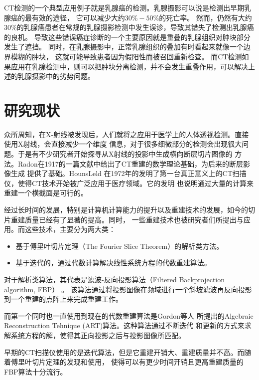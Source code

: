 CT检测的一个典型应用例子就是乳腺癌的检测。乳腺摄影可以说是检测出早期乳腺癌的最有效的途径，
它可以减少大约$30\%-50\%$的死亡率。
然而，仍然有大约$30\%$的乳腺癌患者在常规的乳腺摄影检测中发生误诊，导致其错失了检测出乳腺癌的良机。
导致这些错误癌症诊断的一个主要原因就是重叠的乳腺组织对肿块部分发生了遮挡。
同时，在乳腺摄影中，正常乳腺组织的叠加有时看起来就像一个边界模糊的肿块，
这就可能导致患者因为假阳性而被召回重新检查。
而CT检测如果应用在乳腺检测中，则可以把肿块分离检测，并不会发生重叠作用，可以解决上述的乳腺摄影中的劣势问题。

\section{研究现状}\label{sec:current}
众所周知，在X-射线被发现后，人们就将之应用于医学上的人体透视检测。直接使用X射线，会直接减少一个维度
信息，对于很多细微部分的检测会出现很大问题。于是有不少研究者开始探寻从X射线的投影中生成横向断层切片图像的
方法。Radon在1917的一篇文献中给出了CT重建的数学理论基础\cite{radon1986}，为后来的断层影像生成
提供了基础。HounsLeld 在1972年的发明了第一台真正意义上的CT扫描仪，使得CT技术开始被广泛应用于医疗领域。它的发明
也说明通过大量的计算来重建一个横截面是可行的。

经过长时间的发展，特别是计算机计算能力的提升以及重建技术的发展，如今的切片重建质量已经有了显著的提高。同时，
一些重建技术也被研究者们所提出与应用。而这些技术，主要分为两大类\cite{mueller1998fast}\cite{chlewicki20013d}：
\begin{itemize}
\item 基于傅里叶切片定理（The Fourier Slice Theorem）\cite{bracewell1986fourier}的解析类方法。
\item 基于迭代的，通过代数计算解决线性系统方程的代数重建算法。
\end{itemize}

对于解析类算法，其代表是滤波-反向投影算法（Filtered Backprojection algorithm, FBP）
\cite{bracewell1967inversion}\cite{ramachandran1971three}。
该算法通过将投影图像在频域进行一个斜坡滤波再反向投影
到一个重建的点阵上来完成重建工作。

而第一个同时也一直使用到现在的代数重建算法是Gordon等人\cite{gordon1970algebraic}
所提出的Algebraic Reconstruction Tehnique (ART)算法。这种算法通过不断迭代
和更新的方式来求解系统方程的解，使得其正向投影之后与投影图像所匹配。

早期的CT扫描仪使用的是迭代算法，但是它重建开销大、重建质量并不高。而随着傅里叶切片定理的发现和使用，
使得可以有更少时间开销且更高重建质量的FBP算法十分流行。

